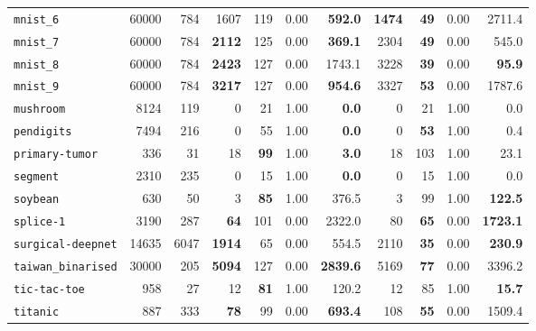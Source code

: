 \begin{tabular}{lccrrrrrrrr}
\texttt{mnist\_6} & \multicolumn{1}{r}{60000} & \multicolumn{1}{r}{784}  & 1607 & 119 & 0.00 & \textbf{592.0} & \textbf{1474} & \textbf{49} & 0.00 & 2711.4\\
\texttt{mnist\_7} & \multicolumn{1}{r}{60000} & \multicolumn{1}{r}{784}  & \textbf{2112} & 125 & 0.00 & \textbf{369.1} & 2304 & \textbf{49} & 0.00 & 545.0\\
\texttt{mnist\_8} & \multicolumn{1}{r}{60000} & \multicolumn{1}{r}{784}  & \textbf{2423} & 127 & 0.00 & 1743.1 & 3228 & \textbf{39} & 0.00 & \textbf{95.9}\\
\texttt{mnist\_9} & \multicolumn{1}{r}{60000} & \multicolumn{1}{r}{784}  & \textbf{3217} & 127 & 0.00 & \textbf{954.6} & 3327 & \textbf{53} & 0.00 & 1787.6\\
\texttt{mushroom} & \multicolumn{1}{r}{8124} & \multicolumn{1}{r}{119}  & 0 & 21 & 1.00 & \textbf{0.0} & 0 & 21 & 1.00 & 0.0\\
\texttt{pendigits} & \multicolumn{1}{r}{7494} & \multicolumn{1}{r}{216}  & 0 & 55 & 1.00 & \textbf{0.0} & 0 & \textbf{53} & 1.00 & 0.4\\
\texttt{primary-tumor} & \multicolumn{1}{r}{336} & \multicolumn{1}{r}{31}  & 18 & \textbf{99} & 1.00 & \textbf{3.0} & 18 & 103 & 1.00 & 23.1\\
\texttt{segment} & \multicolumn{1}{r}{2310} & \multicolumn{1}{r}{235}  & 0 & 15 & 1.00 & \textbf{0.0} & 0 & 15 & 1.00 & 0.0\\
\texttt{soybean} & \multicolumn{1}{r}{630} & \multicolumn{1}{r}{50}  & 3 & \textbf{85} & 1.00 & 376.5 & 3 & 99 & 1.00 & \textbf{122.5}\\
\texttt{splice-1} & \multicolumn{1}{r}{3190} & \multicolumn{1}{r}{287}  & \textbf{64} & 101 & 0.00 & 2322.0 & 80 & \textbf{65} & 0.00 & \textbf{1723.1}\\
\texttt{surgical-deepnet} & \multicolumn{1}{r}{14635} & \multicolumn{1}{r}{6047}  & \textbf{1914} & 65 & 0.00 & 554.5 & 2110 & \textbf{35} & 0.00 & \textbf{230.9}\\
\texttt{taiwan\_binarised} & \multicolumn{1}{r}{30000} & \multicolumn{1}{r}{205}  & \textbf{5094} & 127 & 0.00 & \textbf{2839.6} & 5169 & \textbf{77} & 0.00 & 3396.2\\
\texttt{tic-tac-toe} & \multicolumn{1}{r}{958} & \multicolumn{1}{r}{27}  & 12 & \textbf{81} & 1.00 & 120.2 & 12 & 85 & 1.00 & \textbf{15.7}\\
\texttt{titanic} & \multicolumn{1}{r}{887} & \multicolumn{1}{r}{333}  & \textbf{78} & 99 & 0.00 & \textbf{693.4} & 108 & \textbf{55} & 0.00 & 1509.4\\

\end{tabular}
